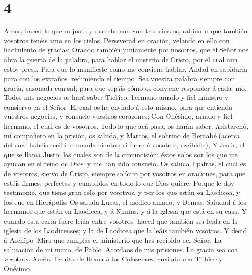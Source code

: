 \hypertarget{section-3}{%
\section{4}\label{section-3}}

 Amos, haced lo que es justo y derecho con vuestros siervos,
sabiendo que también vosotros tenéis amo en los cielos. 
Perseverad en oración, velando en ella con hacimiento de gracias:
 Orando también juntamente por nosotros, que el Señor nos
abra la puerta de la palabra, para hablar el misterio de Cristo, por el
cual aun estoy preso,  Para que lo manifieste como me
conviene hablar.  Andad en sabiduría para con los extraños,
redimiendo el tiempo.  Sea vuestra palabra siempre con
gracia, sazonada con sal; para que sepáis cómo os conviene responder á
cada uno.  Todos mis negocios os hará saber Tichîco, hermano
amado y fiel ministro y consiervo en el Señor:  El cual os
he enviado á esto mismo, para que entienda vuestros negocios, y consuele
vuestros corazones;  Con Onésimo, amado y fiel hermano, el
cual es de vosotros. Todo lo que acá pasa, os harán saber. 
Aristarchô, mi compañero en la prisión, os saluda, y Marcos, el sobrino
de Bernabé (acerca del cual habéis recibido mandamientos; si fuere á
vosotros, recibidle),  Y Jesús, el que se llama Justo; los
cuales son de la circuncisión: éstos solos son los que me ayudan en el
reino de Dios, y me han sido consuelo.  Os saluda Epafras,
el cual es de vosotros, siervo de Cristo, siempre solícito por vosotros
en oraciones, para que estéis firmes, perfectos y cumplidos en todo lo
que Dios quiere.  Porque le doy testimonio, que tiene gran
celo por vosotros, y por los que están en Laodicea, y los que en
Hierápolis.  Os saluda Lucas, el médico amado, y Demas.
 Saludad á los hermanos que están en Laodicea, y á Nimfas,
y á la iglesia que está en su casa.  Y cuando esta carta
fuere leída entre vosotros, haced que también sea leída en la iglesia de
los Laodicenses; y la de Laodicea que la leáis también vosotros.
 Y decid á Archîpo: Mira que cumplas el ministerio que has
recibido del Señor.  La salutación de mi mano, de Pablo.
Acordaos de mis prisiones. La gracia sea con vosotros. Amén. Escrita de
Roma á los Colosenses; enviada con Tichîco y Onésimo.

